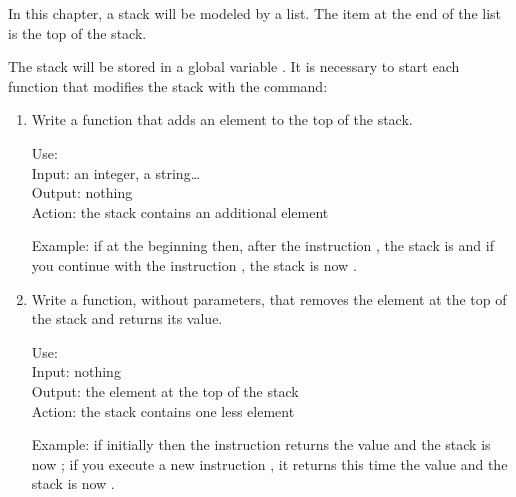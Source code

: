 \documentclass[11pt,class=report,crop=false]{standalone}
\begin{document}
\begin{activite}


In this chapter, a stack will be modeled by a list. The item at the end of the list is the top of the stack.


The stack will be stored in a global variable . 
It is necessary to start each function that modifies the stack with the command: 


\begin{enumerate}
  \item Write a  function that adds an element to the top of the stack.
  
  \begin{fonction}
  Use:  \\
  Input: an integer, a string\ldots \\
  Output: nothing \\
  Action: the stack contains an additional element
  
  \medskip
    
  Example: if at the beginning  then, after the instruction , the stack is \ci{[5,1,3,8]} and if you continue with the instruction
, the stack is now \ci{[5,1,3,8,6]}.     
  \end{fonction}

  \item Write a  function, without parameters, that removes the element at the top of the stack and returns its value.
  
  \begin{fonction}
  Use:  \\
  Input: nothing \\
  Output: the element at the top of the stack \\
  Action: the stack contains one less element
  
  \medskip
    
  Example: if initially  then the instruction  returns the value  and the stack is now \ci{[13,4]}; if you execute a new instruction , it returns this time the value  and the stack is now \ci{[13]}.
  \end{fonction}
  

\end{enumerate}
\end{activite}
\end{document}

